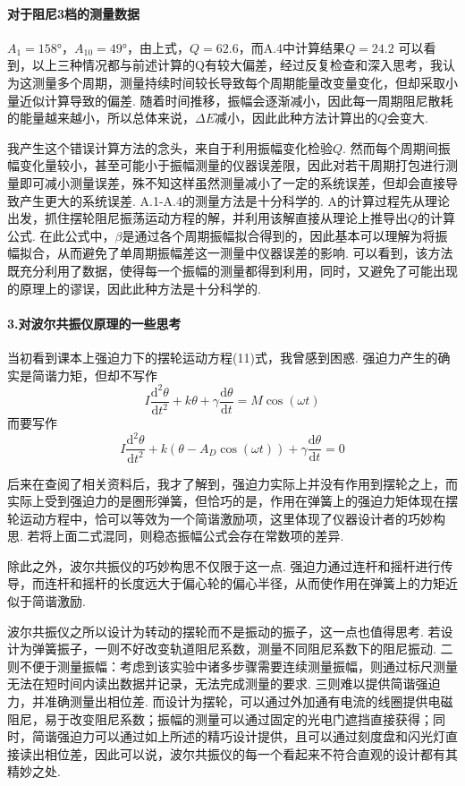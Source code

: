 \documentclass[UTF8]{ctexart}
\begin{document}
\paragraph{对于阻尼3档的测量数据}$A_1=158$°，$A_10=49$°，由上式，$Q=62.6$，而A.4中计算结果$Q=24.2$
可以看到，以上三种情况都与前述计算的Q有较大偏差，经过反复检查和深入思考，我认为这测量多个周期，测量持续时间较长导致每个周期能量改变量变化，但却采取小量近似计算导致的偏差. 随着时间推移，振幅会逐渐减小，因此每一周期阻尼散耗的能量越来越小，所以总体来说，$\Delta E$减小，因此此种方法计算出的$Q$会变大.\par
我产生这个错误计算方法的念头，来自于利用振幅变化检验$Q$. 然而每个周期间振幅变化量较小，甚至可能小于振幅测量的仪器误差限，因此对若干周期打包进行测量即可减小测量误差，殊不知这样虽然测量减小了一定的系统误差，但却会直接导致产生更大的系统误差. A.1-A.4的测量方法是十分科学的. A的计算过程先从理论出发，抓住摆轮阻尼振荡运动方程的解，并利用该解直接从理论上推导出$Q$的计算公式. 在此公式中，$\beta$是通过各个周期振幅拟合得到的，因此基本可以理解为将振幅拟合，从而避免了单周期振幅差这一测量中仪器误差的影响. 可以看到，该方法既充分利用了数据，使得每一个振幅的测量都得到利用，同时，又避免了可能出现的原理上的谬误，因此此种方法是十分科学的.


\paragraph{3.\quad 对波尔共振仪原理的一些思考}\quad\par
当初看到课本上强迫力下的摆轮运动方程(11)式，我曾感到困惑. 强迫力产生的确实是简谐力矩，但却不写作
\[
I\frac{\mathrm{d}^2\theta}{\mathrm{d}t^2}+k\theta+\gamma\frac{\mathrm{d}\theta}{\mathrm{d}t}=M\cos(\omega t)
\]
而要写作
\[
I\frac{\mathrm{d}^2\theta}{\mathrm{d}t^2}+k(\theta-A_D\cos(\omega t))+\gamma\frac{\mathrm{d}\theta}{\mathrm{d}t}=0
\]

后来在查阅了相关资料后，我才了解到，强迫力实际上并没有作用到摆轮之上，而实际上受到强迫力的是圏形弹簧，但恰巧的是，作用在弹簧上的强迫力矩体现在摆轮运动方程中，恰可以等效为一个简谐激励项，这里体现了仪器设计者的巧妙构思. 若将上面二式混同，则稳态振幅公式会存在常数项的差异.\par
除此之外，波尔共振仪的巧妙构思不仅限于这一点. 强迫力通过连杆和摇杆进行传导，而连杆和摇杆的长度远大于偏心轮的偏心半径，从而使作用在弹簧上的力矩近似于简谐激励.\par
波尔共振仪之所以设计为转动的摆轮而不是振动的振子，这一点也值得思考. 若设计为弹簧振子，一则不好改变轨道阻尼系数，测量不同阻尼系数下的阻尼振动. 二则不便于测量振幅：考虑到该实验中诸多步骤需要连续测量振幅，则通过标尺测量无法在短时间内读出数据并记录，无法完成测量的要求. 三则难以提供简谐强迫力，并准确测量出相位差. 而设计为摆轮，可以通过外加通有电流的线圈提供电磁阻尼，易于改变阻尼系数；振幅的测量可以通过固定的光电门遮挡直接获得；同时，简谐强迫力可以通过如上所述的精巧设计提供，且可以通过刻度盘和闪光灯直接读出相位差，因此可以说，波尔共振仪的每一个看起来不符合直观的设计都有其精妙之处.
\end{document}
